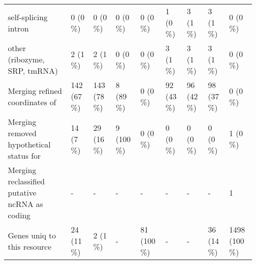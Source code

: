 \begin{table}[H]
\begin{tabular}{lllllllll}
\hspace{1em}self-splicing intron & 0 (0 \%) & 0 (0 \%) & 0 (0 \%) & 0 (0 \%) & 1 (0 \%) & 3 (1 \%) & 3 (1 \%) & 0 (0 \%)\\
\hspace{1em}other (ribozyme, SRP, tmRNA) & 2 (1 \%) & 2 (1 \%) & 0 (0 \%) & 0 (0 \%) & 3 (1 \%) & 3 (1 \%) & 3 (1 \%) & 0 (0 \%)\\
Merging refined coordinates of & 142 (67 \%) & 143 (78 \%) & 8 (89 \%) & 0 (0 \%) & 92 (43 \%) & 96 (42 \%) & 98 (37 \%) & 0 (0 \%)\\
Merging removed hypothetical status for & 14 (7 \%) & 29 (16 \%) & 9 (100 \%) & 0 (0 \%) & 0 (0 \%) & 0 (0 \%) & 0 (0 \%) & 1 (0 \%)\\
Merging reclassified putative ncRNA as coding & - & - & - & - & - & - & - & 1\\
Genes uniq to this resource & 24 (11 \%) & 2 (1 \%) & - & 81 (100 \%) & - & - & 36 (14 \%) & 1498 (100 \%)\\
\bottomrule
\end{tabular}
\end{table}

